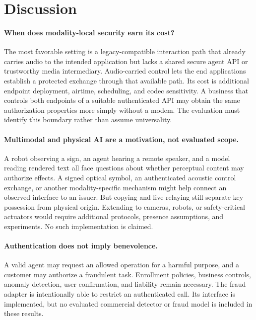 \section{Discussion}
\label{sec:discussion}
\paragraph{When does modality-local security earn its cost?}
The most favorable setting is a legacy-compatible interaction path that
already carries audio to the intended application but lacks a shared secure
agent API or trustworthy media intermediary. Audio-carried control lets the
end applications establish a protected exchange through that available path.
Its cost is additional endpoint deployment, airtime, scheduling, and codec
sensitivity. A business that controls both endpoints of a suitable authenticated
API may obtain the same authorization properties more simply without a modem.
The evaluation must identify this boundary rather than assume universality.

\paragraph{Multimodal and physical AI are a motivation, not evaluated scope.}
A robot observing a sign, an agent hearing a remote speaker, and a model
reading rendered text all face questions about whether perceptual content
may authorize effects. A signed optical symbol, an authenticated acoustic
control exchange, or another modality-specific mechanism might help connect
an observed interface to an issuer. But copying and live relaying still
separate key possession from physical origin. Extending \sys{} to cameras,
robots, or safety-critical actuators would require additional protocols,
presence assumptions, and experiments. No such implementation is claimed.

\paragraph{Authentication does not imply benevolence.}
A valid agent may request an allowed operation for a harmful purpose, and a
customer may authorize a fraudulent task. Enrollment policies, business
controls, anomaly detection, user confirmation, and liability remain necessary.
The fraud adapter is intentionally able to restrict an authenticated call.
Its interface is implemented, but no evaluated commercial detector or fraud
model is included in these results.

